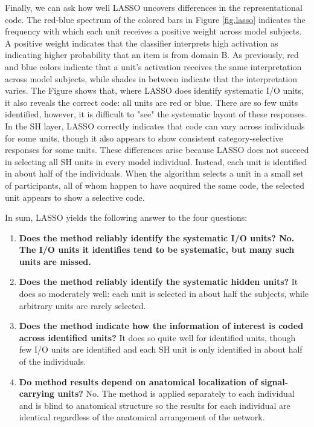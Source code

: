 Finally, we can ask how well LASSO uncovers differences in the representational code. The red-blue spectrum of the colored bars in Figure \ref{fig.lasso} indicates the frequency with which each unit receives a positive weight across model subjects. A positive weight indicates that the classifier interprets high activation as indicating higher probability that an item is from domain B. As previously, red and blue colors indicate that a unit's activation receives the same interpretation across model subjects, while shades in between indicate that the interpretation varies. The Figure shows that, where LASSO does identify systematic I/O units, it also reveals the correct code: all units are red or blue. There are so few units identified, however, it is difficult to "see" the systematic layout of these responses. In the SH layer, LASSO correctly indicates that code can vary across individuals for some units, though it also appears to show consistent category-selective responses for some units. These differences arise because LASSO does not succeed in selecting all SH units in every model individual. Instead, each unit is identified in about half of the individuals. When the algorithm selects a unit in a small set of participants, all of whom happen to have acquired the same code, the selected unit appears to show a selective code.

In sum, LASSO yields the following answer to the four questions:
\begin{enumerate}
\item \bf{Does the method reliably identify the systematic I/O units?} No. The I/O units it identifies tend to be systematic, but many such units are missed.
\item {\bf Does the method reliably identify the systematic hidden units?} It does so moderately well: each unit is selected in about half the subjects, while arbitrary units are rarely selected.
\item {\bf Does the method indicate how the information of interest is coded across identified units?} It does so quite well for identified units, though few I/O units are identified and each SH unit is only identified in about half of the individuals.
\item {\bf Do method results depend on anatomical localization of signal-carrying units?} No. The method is applied separately to each individual and is blind to anatomical structure so the results for each individual are identical regardless of the anatomical arrangement of the network.
\end{enumerate}

